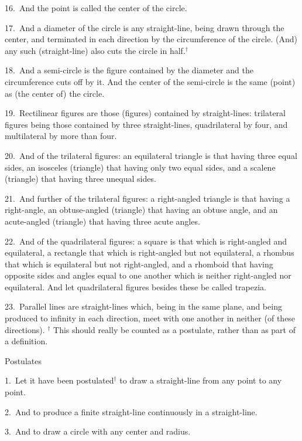 16.~And the point is called the center of the circle.

17.~And a diameter of the circle is any straight-line, being drawn through the
center, and terminated in each direction by the circumference of the circle. (And) any such (straight-line) also cuts the circle in half.$^\dag$

18.~And a semi-circle is the figure contained by the diameter  and
the circumference  cuts off by it. And the center of the semi-circle is the same (point)
as (the center of) the circle.

19.~Rectilinear figures are those (figures) contained by straight-lines: trilateral
figures being those contained by three straight-lines,  quadrilateral   by four,
and multilateral by more than four.

20.~And of the trilateral figures: an equilateral triangle is that having
three equal sides, an isosceles (triangle) that having only two equal sides,
and a scalene (triangle) that having three unequal sides.

21.~And further of the trilateral figures: a right-angled triangle is that having
a right-angle, an obtuse-angled  (triangle) that having an obtuse
angle, and an acute-angled (triangle) that having three acute angles.

22.~And of the quadrilateral figures: a square is that which is right-angled
and equilateral, a rectangle that which is right-angled but not equilateral,
a rhombus that which is equilateral but not right-angled, and a rhomboid that
having opposite sides and angles equal to one another which is neither
right-angled nor equilateral. And let quadrilateral figures besides these be called
trapezia.

23.~Parallel lines are straight-lines which, being in the same plane, and
being produced to infinity in each direction, meet with one another in
neither (of these directions).
{\footnotesize 
\noindent $^\dag$ This should really be counted as a postulate, rather than as part of a definition.}


\begin{center}
{\large Postulates}
\end{center}

1.~Let it have been postulated$^\dag$ to draw a straight-line from any point to any point.

2.~And to produce a finite straight-line continuously in a straight-line.

3.~And to draw a circle with any center and radius.

